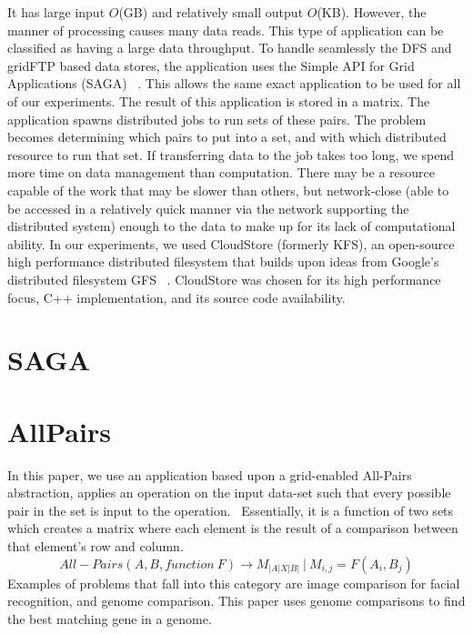 \documentclass{rspublic}
\begin{document}
It has large input $O$(GB) and relatively small output $O$(KB).
However, the manner of processing causes many data reads.  This type of
application can be classified as having a large data throughput.  To
handle seamlessly the DFS and gridFTP based data stores, the application
uses the Simple API for Grid Applications (SAGA) ~\citep{saga_web}.
This allows the same exact application to be used for all of our
experiments.  The result of this application is stored in a matrix.  The
application spawns distributed jobs to run sets of these pairs.  The
problem becomes determining which pairs to put into a set, and with
which distributed resource to run that set.  If transferring data to the
job takes too long, we spend more time on data management than
computation.  There may be a resource capable of the work that may be
slower than others, but network-close (able to be accessed in a
relatively quick manner via the network supporting the distributed
system) enough to the data to make up for its lack of computational
ability.  In our experiments, we used CloudStore (formerly KFS), an
open-source high performance distributed filesystem that builds upon
ideas from Google's distributed filesystem GFS ~\citep{cloudstore_web}.
CloudStore was chosen for its high performance focus, C++
implementation, and its source code availability.

\section{SAGA}

\section{AllPairs} In this paper, we use an application based upon a
grid-enabled All-Pairs abstraction,  applies an operation on the input
data-set such that every possible pair in the set is input to the
operation.~\citep{Interop, AllPairs}  Essentially, it is a function of
two sets which creates a matrix where each element is the result of a
comparison between that element's row and column.  \begin{equation}
All-Pairs(A, B, function\ F) \rightarrow M_{|A|X|B|}\ |\ M_{i,j} =
F(A_{i},B_{j}) \end{equation} Examples of problems that fall into this
category are image comparison for facial recognition, and genome
comparison.  This paper uses genome comparisons to find the best
matching gene in a genome. 
\end{document}
